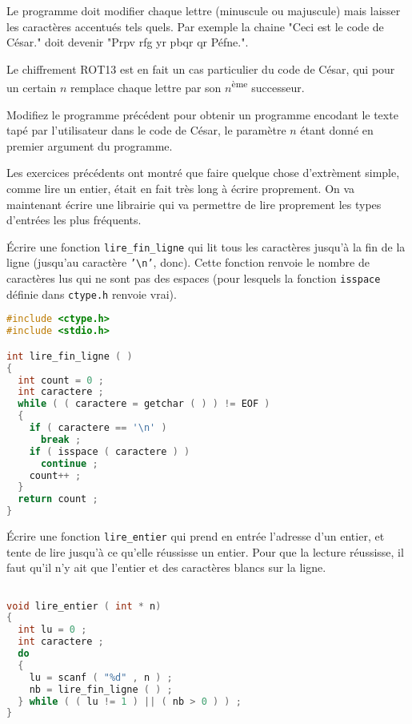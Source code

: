 Le programme doit modifier chaque lettre (minuscule ou majuscule) mais
laisser les caractères accentués tels quels. Par exemple la chaine
"Ceci est le code de César." doit devenir "Prpv rfg yr pbqr qr
Péfne.".

Le chiffrement ROT13 est en fait un cas particulier du code de César,
qui pour un certain $n$ remplace chaque lettre par son $n$\textsuperscript{ème} successeur.

\question Modifiez le programme précédent pour obtenir un programme
encodant le texte tapé par l'utilisateur dans le code de César, le
paramètre $n$ étant donné en premier argument du programme.


Les exercices précédents ont montré que faire quelque chose
d'extrèment simple, comme lire un entier, était en fait très long à
écrire proprement. On va maintenant écrire une librairie qui va permettre
de lire proprement les types d'entrées les plus fréquents.

\question Écrire une fonction \texttt{lire\_fin\_ligne} qui lit tous
les caractères jusqu'à la fin de la ligne (jusqu'au caractère
\texttt{'\textbackslash n'}, donc). Cette fonction renvoie le nombre
de caractères lus qui ne sont pas des espaces (pour lesquels la
fonction \texttt{isspace} définie dans \texttt{ctype.h} renvoie vrai).



\begin{solution}
  \begin{lstlisting}[language=C]
#include <ctype.h>
#include <stdio.h>

int lire_fin_ligne ( ) 
{
  int count = 0 ;
  int caractere ;
  while ( ( caractere = getchar ( ) ) != EOF )
  {
    if ( caractere == '\n' )
      break ;
    if ( isspace ( caractere ) )
      continue ;
    count++ ;
  }
  return count ;
}
  \end{lstlisting}
\end{solution}

\question Écrire une fonction \texttt{lire\_entier} qui prend en
entrée l'adresse d'un entier, et tente de lire jusqu'à ce qu'elle
réussisse un entier. Pour que la lecture réussisse, il faut qu'il n'y
ait que l'entier et des caractères blancs sur la ligne.

\begin{solution}
  \begin{lstlisting}[language=C]

void lire_entier ( int * n) 
{
  int lu = 0 ;
  int caractere ;
  do
  {
    lu = scanf ( "%d" , n ) ;
    nb = lire_fin_ligne ( ) ;
  } while ( ( lu != 1 ) || ( nb > 0 ) ) ;
}
  \end{lstlisting}
\end{solution}

